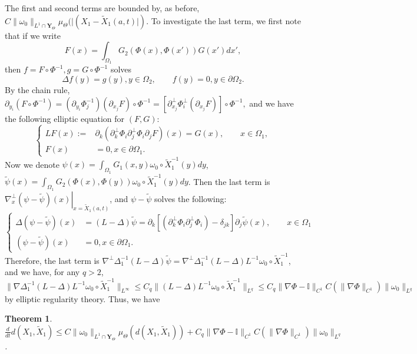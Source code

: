 \documentclass[12pt]{article}
\newtheorem{theorem}{Theorem}
\begin{document}
The first and second terms are bounded by, as before, $C \| \omega_0 \|_{L^1 \cap \mathbf{Y}_{\Theta} } \mu_{\Theta} (| (X_1 - \tilde{X}_1 (a,t) | )$. To investigate the last term, we first note that if we write
\begin{equation}
F(x) = \int_{\Omega_1} G_2 (\Phi (x), \Phi (x') ) G(x') dx', 
\end{equation}
then $f = F \circ \Phi^{-1}, g = G \circ \Phi^{-1}$ solves 
\begin{equation*}
\Delta f(y) = g(y), y \in \Omega_2, \qquad f(y) = 0, y \in \partial \Omega_2.
\end{equation*}
By the chain rule, $\partial_{y_i} (F\circ \Phi^{-1} ) = (\partial_{y_i} \Phi^{-1} _j ) (\partial_{x_j} F) \circ \Phi^{-1} = \left [\partial_{x_j}^\perp \Phi_i^{\perp} (\partial_{x_j } F) \right ] \circ \Phi^{-1},$ and we have the following elliptic equation for $(F, G)$:
\begin{equation}
\left \{
\begin{split}
LF (x) := &\partial_{k} ( \partial_k^\perp \Phi_i \partial_j^\perp \Phi_i \partial_j F) (x) = G (x), \qquad x \in \Omega_1, \\
F(x) &= 0, x \in \partial \Omega_1.
\end{split} \right.
\end{equation}
Now we denote $\psi (x) = \int_{\Omega_1} G_1 (x,y) \omega_0 \circ \tilde{X}_1 ^{-1} (y) dy$, $\tilde{\psi} (x) = \int_{\Omega_1} G_2 (\Phi (x), \Phi(y) ) \omega_0 \circ \tilde{X}_1 ^{-1} (y) dy$. Then the last term is $\left.\nabla_x^\perp (\psi - \tilde{\psi} )(x)  \right |_{x = \tilde{X}_1 (a,t) }$, and $\psi - \tilde{\psi}$ solves the following:
\begin{equation}
\left \{
\begin{split}
\Delta (\psi - \tilde{\psi} )(x)  &= (L - \Delta) \tilde{\psi} = \partial_k \left [ (\partial_k^\perp \Phi_i \partial_j^\perp \Phi_i ) - \delta_{jk} \right ] \partial_j \tilde{\psi} (x),  \qquad x \in \Omega_1 \\
(\psi - \tilde{\psi}) (x) &= 0, x \in \partial \Omega_1.
\end{split} \right.
\end{equation}
Therefore, the last term is $\nabla^\perp \Delta_1 ^{-1} (L- \Delta) \tilde{\psi} = \nabla^\perp \Delta_1 ^{-1} (L- \Delta) L^{-1} \omega_0 \circ \tilde{X}_1 ^{-1} $, and we have, for any $q>2$, 
\begin{equation*}
\| \nabla \Delta_1 ^{-1} (L - \Delta) L^{-1} \omega_0 \circ \tilde{X}_1 ^{-1}  \|_{L^\infty} \le C_q \| (L - \Delta) L^{-1} \omega_0 \circ \tilde{X}_1 ^{-1} \|_{L^q} \le C_q  \| \nabla \Phi - \mathbb{I} \|_{C^1} C(\| \nabla \Phi \|_{C^1} ) \| \omega_0 \|_{L^q}
\end{equation*}
by elliptic regularity theory. Thus, we have
\begin{theorem} \label{theorem2}
$\frac{d}{dt} d( X_1 , \tilde{X}_1 ) \le C \| \omega_0 \|_{L^1 \cap \mathbf{Y}_{\Theta} } \mu_{\Theta} (d( X_1 , \tilde{X}_1 ) ) + C_q  \| \nabla \Phi - \mathbb{I} \|_{C^1} C(\| \nabla \Phi \|_{C^1} ) \| \omega_0 \|_{L^q}$.
\end{theorem}
\end{document}
